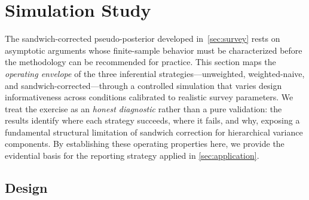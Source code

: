 
\section{Simulation Study}\label{sec:simulation}

The sandwich-corrected pseudo-posterior developed in~\cref{sec:survey}
rests on asymptotic arguments whose finite-sample behavior must be
characterized before the methodology can be recommended for practice.
This section maps the \emph{operating envelope} of the three inferential
strategies---unweighted, weighted-naive, and sandwich-corrected---through
a controlled simulation that varies design informativeness across conditions
calibrated to realistic survey parameters. We treat the exercise as an
\emph{honest diagnostic} rather than a pure validation: the results identify
where each strategy succeeds, where it fails, and why, exposing a
fundamental structural limitation of sandwich correction for hierarchical
variance components. By establishing these operating properties here,
we provide the evidential basis for the reporting strategy applied in
\cref{sec:application}.


\subsection{Design}\label{sec:simdesign}

